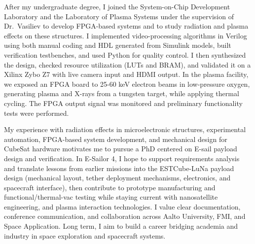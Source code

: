 \documentclass[a4paper,12pt]{article}
\begin{document}
\vspace{10pt}
After my undergraduate degree, I joined the System-on-Chip Development Laboratory and the Laboratory of Plasma Systems under the supervision of Dr.\ Vasiliev to develop FPGA-based systems and to study radiation and plasma effects on these structures. I implemented video-processing algorithms in Verilog using both manual coding and HDL generated from Simulink models, built verification testbenches, and used Python for quality control. I then synthesized the design, checked resource utilization (LUTs and BRAM), and validated it on a Xilinx Zybo Z7 with live camera input and HDMI output. In the plasma facility, we exposed an FPGA board to 25-60 keV electron beams in low-pressure oxygen, generating plasma and X-rays from a tungsten target, while applying thermal cycling. The FPGA output signal was monitored and preliminary functionality tests were performed.

\vspace{10pt}
My experience with radiation effects in microelectronic structures, experimental automation, FPGA-based system development, and mechanical design for CubeSat hardware motivates me to pursue a PhD centered on E-sail payload design and verification. In E-Sailor 4, I hope to support requirements analysis and translate lessons from earlier missions into the ESTCube-LuNa payload design (mechanical layout, tether deployment mechanisms, electronics, and spacecraft interface), then contribute to prototype manufacturing and functional/thermal-vac testing while staying current with nanosatellite engineering, and plasma interaction technologies. I value clear documentation, conference communication, and collaboration across Aalto University, FMI, and Space Application. Long term, I aim to build a career bridging academia and industry in space exploration and spacecraft systems.
\end{document}
